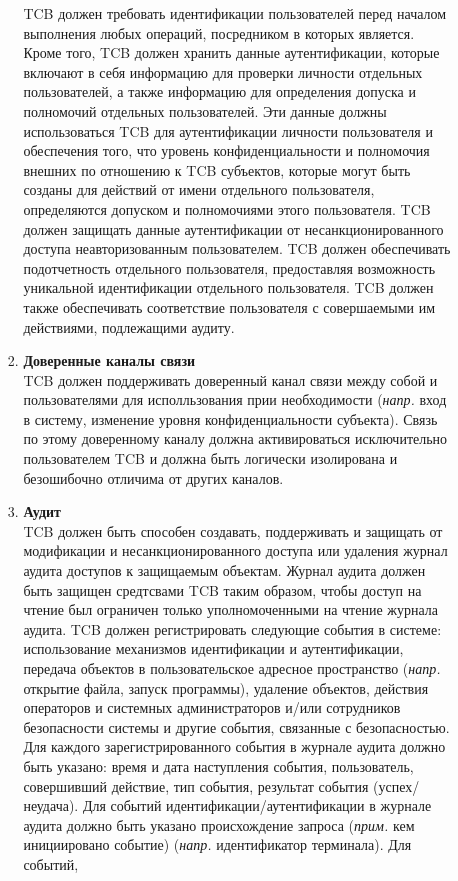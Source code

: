 \begin{enumerate}
\begin{enumerate}
\begin{enumerate}
			TCB должен требовать идентификации пользователей перед началом выполнения любых операций, посредником в которых является. Кроме того, TCB должен хранить данные аутентификации, 
			которые включают в себя информацию для проверки личности отдельных пользователей, а также информацию для определения допуска и полномочий отдельных пользователей. Эти данные должны 
			использоваться TCB для аутентификации личности пользователя и обеспечения того, что уровень конфиденциальности и полномочия внешних по отношению к TCB субъектов, которые 
			могут быть созданы для действий от имени отдельного пользователя, определяются допуском и полномочиями этого пользователя. TCB должен защищать данные аутентификации от 
			несанкционированного доступа неавторизованным пользователем. TCB должен обеспечивать подотчетность отдельного пользователя, предоставляя возможность уникальной идентификации отдельного
			пользователя. TCB должен также обеспечивать соответствие пользователя с совершаемыми им действиями, подлежащими аудиту.
			\item{\textbf{Доверенные каналы	связи}}\\
			TCB должен поддерживать доверенный канал связи между собой и пользователями для исполльзования прии необходимости (\textit{напр.} вход в систему, изменение уровня конфиденциальности
			субъекта). Связь по этому доверенному каналу должна активироваться исключительно пользователем TCB и должна быть логически изолирована и безошибочно отличима от других каналов.
			\item{\textbf{Аудит}}\\
			TCB должен быть способен создавать, поддерживать и защищать от модификации и несанкционированного доступа или удаления журнал аудита доступов к защищаемым объектам. Журнал аудита 
			должен быть защищен средтсвами TCB таким образом, чтобы доступ на чтение был ограничен только уполномоченными на чтение журнала аудита. TCB должен регистрировать следующие события
			в системе: использование механизмов идентификации и аутентификации, передача объектов в пользовательское адресное пространство (\textit{напр.} открытие файла, запуск программы),
			удаление объектов, действия операторов и системных администраторов и/или сотрудников безопасности системы и другие события, связанные с безопасностью. Для каждого зарегистрированного
			события в журнале аудита должно быть указано: время и дата наступления события, пользователь, совершивший действие, тип события, результат события (успех/неудача). Для событий
			идентификации/аутентификации в журнале аудита должно быть указано происхождение запроса (\textit{прим.} кем инициировано событие) (\textit{напр.} идентификатор терминала). Для событий,

\end{enumerate}
\end{enumerate}
\end{enumerate}
